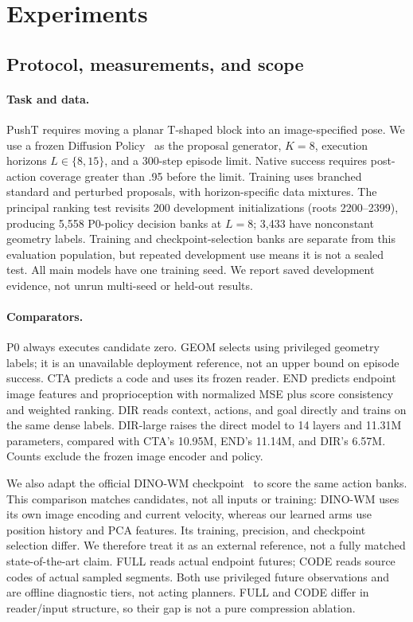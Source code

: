 \section{Experiments}
\label{sec:experiments}
\subsection{Protocol, measurements, and scope}
\label{sec:protocol}
\paragraph{Task and data.}
PushT requires moving a planar T-shaped block into an image-specified pose. We use a frozen Diffusion Policy~\cite{chi2023diffusion} as the proposal generator, $K=8$, execution horizons $L\in\{8,15\}$, and a 300-step episode limit. Native success requires post-action coverage greater than .95 before the limit. Training uses branched standard and perturbed proposals, with horizon-specific data mixtures. The principal ranking test revisits 200 development initializations (roots 2200--2399), producing 5,558 P0-policy decision banks at $L=8$; 3,433 have nonconstant geometry labels. Training and checkpoint-selection banks are separate from this evaluation population, but repeated development use means it is not a sealed test. All main models have one training seed. We report saved development evidence, not unrun multi-seed or held-out results.

\paragraph{Comparators.}
P0 always executes candidate zero. GEOM selects using privileged geometry labels; it is an unavailable deployment reference, not an upper bound on episode success. CTA predicts a code and uses its frozen reader. END predicts endpoint image features and proprioception with normalized MSE plus score consistency and weighted ranking. DIR reads context, actions, and goal directly and trains on the same dense labels. DIR-large raises the direct model to 14 layers and 11.31M parameters, compared with CTA's 10.95M, END's 11.14M, and DIR's 6.57M. Counts exclude the frozen image encoder and policy.

We also adapt the official DINO-WM checkpoint~\cite{zhou2025dinowm} to score the same action banks. This comparison matches candidates, not all inputs or training: DINO-WM uses its own image encoding and current velocity, whereas our learned arms use position history and PCA features. Its training, precision, and checkpoint selection differ. We therefore treat it as an external reference, not a fully matched state-of-the-art claim. FULL reads actual endpoint futures; CODE reads source codes of actual sampled segments. Both use privileged future observations and are offline diagnostic tiers, not acting planners. FULL and CODE differ in reader/input structure, so their gap is not a pure compression ablation.

